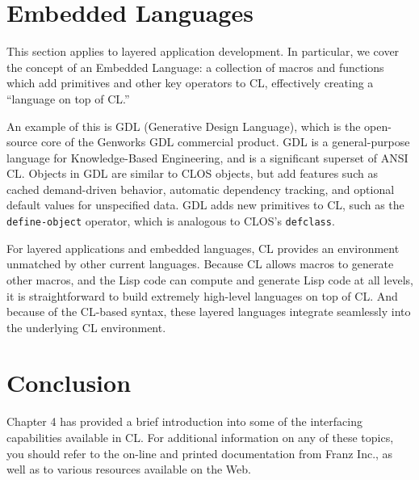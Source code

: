 \section{Embedded Languages}

This section applies to layered application development. In particular, we cover the concept
of an Embedded Language: a collection of macros and functions which add primitives and
other key operators to CL, effectively creating a ``language on top of CL.''

An example of this is GDL (Generative Design Language), which is the open-source
core of the Genworks\textregistered{} GDL commercial product. GDL is a general-purpose language
for Knowledge-Based Engineering, and is a significant superset of ANSI CL. Objects in
GDL are similar to CLOS objects, but add features such as cached demand-driven behavior,
automatic dependency tracking, and optional default values for unspecified data. GDL adds
new primitives to CL, such as the \texttt{define-object} operator, which is analogous to CLOS's
\texttt{defclass}.

For layered applications and embedded languages, CL provides an environment unmatched
by other current languages. Because CL allows macros to generate other macros, and the
Lisp code can compute and generate Lisp code at all levels, it is straightforward to build
extremely high-level languages on top of CL. And because of the CL-based syntax, these
layered languages integrate seamlessly into the underlying CL environment.

\section{Conclusion}

Chapter 4 has provided a brief introduction into some of the interfacing capabilities available
in CL. For additional information on any of these topics, you should refer to the on-line
and printed documentation from Franz Inc., as well as to various resources available on the
Web.
